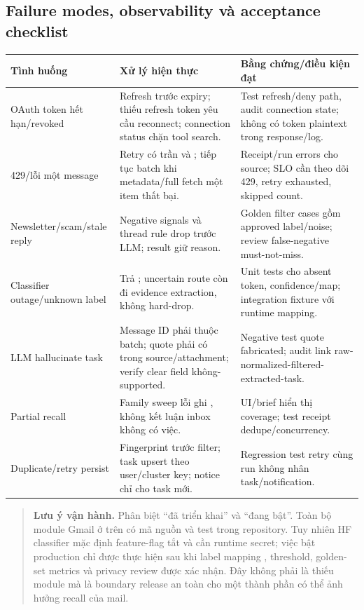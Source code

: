 \documentclass[11pt,a4paper]{article}
\newcommand{\code}[1]{\texttt{\detokenize{#1}}}
\newcommand{\warningnote}[1]{\begin{quote}\color{mondaiywarn}\textbf{Lưu ý vận hành.} #1\end{quote}}
\begin{document}
\subsection{Failure modes, observability và acceptance checklist}
\begin{longtable}{p{3.0cm}p{5.0cm}p{4.9cm}}
\toprule
\textbf{Tình huống} & \textbf{Xử lý hiện thực} & \textbf{Bằng chứng/điều kiện đạt} \\
\midrule
\endhead
OAuth token hết hạn/revoked & Refresh trước expiry; thiếu refresh token yêu cầu reconnect; connection status chặn tool search. & Test refresh/deny path, audit connection state; không có token plaintext trong response/log. \\
429/lỗi một message & Retry có trần và \code{Retry-After}; tiếp tục batch khi metadata/full fetch một item thất bại. & Receipt/run errors cho source; SLO cần theo dõi 429, retry exhausted, skipped count. \\
Newsletter/scam/stale reply & Negative signals và thread rule drop trước LLM; result giữ reason. & Golden filter cases gồm approved label/noise; review false-negative must-not-miss. \\
Classifier outage/unknown label & Trả \code{None}; uncertain route còn đi evidence extraction, không hard-drop. & Unit tests cho absent token, confidence/map; integration fixture \code{POS/NEG} với runtime mapping. \\
LLM hallucinate task & Message ID phải thuộc batch; quote phải có trong source/attachment; verify clear field không-supported. & Negative test quote fabricated; audit link raw-normalized-filtered-extracted-task. \\
Partial recall & Family sweep lỗi ghi \code{partial}, không kết luận inbox không có việc. & UI/brief hiển thị coverage; test receipt dedupe/concurrency. \\
Duplicate/retry persist & Fingerprint trước filter; task upsert theo user/cluster key; notice chỉ cho task mới. & Regression test retry cùng run không nhân task/notification. \\
\bottomrule
\end{longtable}

\warningnote{Phân biệt ``đã triển khai'' và ``đang bật''. Toàn bộ module Gmail ở trên có mã nguồn và test trong repository. Tuy nhiên HF classifier mặc định feature-flag tắt và cần runtime secret; việc bật production chỉ được thực hiện sau khi label mapping \code{POS/NEG}, threshold, golden-set metrics và privacy review được xác nhận. Đây không phải là thiếu module mà là boundary release an toàn cho một thành phần có thể ảnh hưởng recall của mail.}
\end{document}

